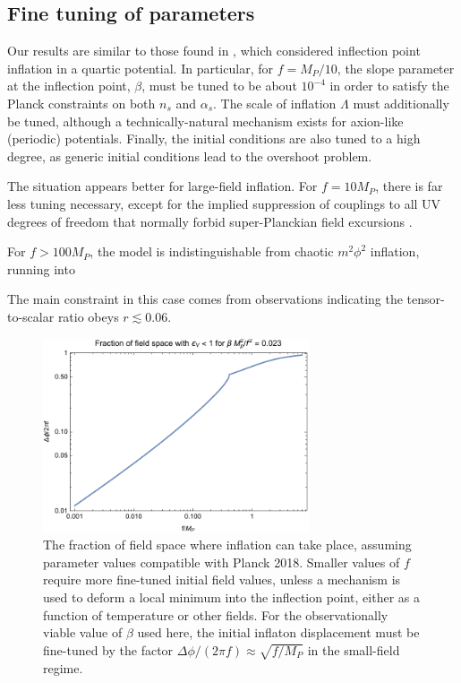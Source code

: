 \documentclass[aps,amsfonts,amsmath,prd,preprint,nofootinbib,superscriptaddress]{revtex4}
\newcommand{\Mp}{{M_{P}}}
\begin{document}
\subsection{Fine tuning of parameters}
Our results are similar to those found in \cite{Musoke:2017frr}, which considered inflection point inflation in a quartic potential.  In particular, for $f = \Mp/10$, the slope parameter at the inflection point, $\beta$, must be
tuned to be about $10^{-4}$ in order to satisfy the Planck constraints on both $n_s$ and $\alpha_s$.  The scale of inflation $\Lambda$ must additionally be tuned, although a technically-natural mechanism exists for axion-like (periodic) potentials.  Finally, the initial conditions are also tuned to a high degree, as generic initial conditions lead to the overshoot problem.

The situation appears better for large-field inflation.
For $f = 10 \Mp$, there is far less tuning necessary, except for the implied suppression of couplings to all UV degrees of freedom that normally forbid super-Planckian field excursions \cite{swampland, monodromy}.

For $f > 100 \Mp$, the model is indistinguishable from chaotic $m^2\phi^2$ inflation, running into  

The main constraint in this case comes from observations indicating the tensor-to-scalar ratio obeys $r \lesssim 0.06$.

\begin{figure}[!h]
  \centering
    \includegraphics[width=0.7\textwidth]{figures/SRfraction.pdf}
    \caption{The fraction of field space where inflation can take place, assuming parameter values compatible with Planck 2018.  Smaller values of $f$ require more fine-tuned initial field values, unless a 
    mechanism is used to deform a local minimum into the inflection point, either
    as a function of temperature or other fields.  For the observationally viable value of $\beta$ used here, the initial inflaton displacement must be fine-tuned by the factor $\Delta\phi/(2\pi f) \approx \sqrt{f/\Mp}$ in the small-field regime.}
\end{figure}
\end{document}
